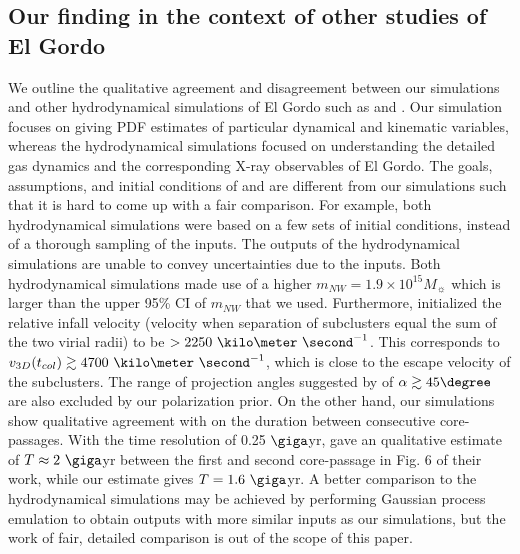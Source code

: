 \subsection{Our finding in the context of other studies of El Gordo}
We outline the qualitative agreement and disagreement between our
simulations and other hydrodynamical simulations of El Gordo such as
\cite{Donnert13} and \cite{Molnar14}. Our simulation focuses on giving PDF
estimates of particular dynamical and kinematic variables, whereas the
hydrodynamical simulations focused on understanding the detailed gas dynamics
and the corresponding X-ray observables of El Gordo. The goals,
assumptions, and initial conditions of \cite{Donnert13} and \cite{Molnar14}
are different from our simulations such that it is hard to come up with a
fair comparison. 
For example, both hydrodynamical simulations were based on a few sets of initial
conditions, instead of a thorough sampling of the inputs. The outputs of
the hydrodynamical simulations are unable to convey uncertainties due to
the inputs. Both hydrodynamical simulations made use of a higher $m_{NW} =
1.9 \times 10^{15} M_{\sun}$ which is larger than the upper 95\% CI of $m_{NW}$
that we used. Furthermore, \cite{Molnar14} initialized the relative infall velocity (velocity when separation of subclusters equal the sum
of the two virial radii) to be $> 2250~\kilo \meter~
\second^{-1}$. This corresponds to $v_{3D}(t_{col}) \gtrsim 4700~\kilo
\meter~\second^{-1}$, which is close to the escape velocity of the
subclusters. The range of projection angles suggested by
\cite{Molnar14} of $\alpha \gtrsim 45\degree$ are also excluded by our polarization prior.  On the other hand, our simulations show qualitative agreement with
\cite{Donnert13} on the duration between consecutive core-passages. With
the time resolution of 0.25 $\giga$yr, \cite{Donnert13} gave an
qualitative estimate of  $T\approx 2~\giga$yr between the first and second
core-passage in Fig. 6 of their work, while our estimate gives $T
= 1.6~\giga$yr.  A better comparison to the hydrodynamical simulations
may be achieved by performing Gaussian process emulation to obtain outputs
with more similar inputs as our simulations, but the work of fair, detailed
comparison is out of the scope of this paper. 

